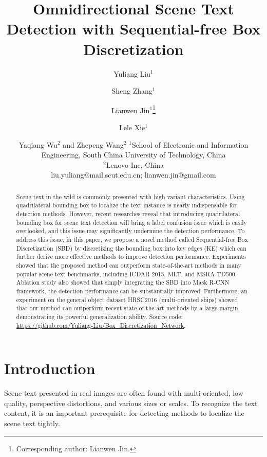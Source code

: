 \documentclass{article}
\title{Omnidirectional Scene Text Detection with Sequential-free Box Discretization}
\author{
Yuliang Liu$^1$\and
Sheng Zhang$^1$\and
Lianwen Jin$^1$\footnote{Corresponding author: Lianwen Jin.}\and
Lele Xie$^1$\and
Yaqiang Wu$^2$ \textnormal{and} Zhepeng Wang$^2$
\affiliations
$^1$School of Electronic and Information Engineering, South China University of Technology, China \\
$^2$Lenovo Inc, China\\
\emails
liu.yuliang@mail.scut.edu.cn; lianwen.jin@gmail.com
}
\begin{document}
\maketitle

\begin{abstract}
Scene text in the wild is commonly presented with high variant characteristics. Using quadrilateral bounding box to localize the text instance is nearly indispensable for detection methods. However, recent researches reveal that introducing quadrilateral bounding box for scene text detection will bring a label confusion issue which is easily overlooked, and this issue may significantly undermine the detection performance. 
To address this issue, in this paper, we propose a novel method called Sequential-free Box Discretization (SBD) by discretizing the bounding box into key edges (KE) which can further derive more effective methods to improve detection performance. 
Experiments showed that the proposed method can outperform state-of-the-art methods in many popular scene text benchmarks, including ICDAR 2015, MLT, and MSRA-TD500. Ablation study also showed that simply integrating the SBD into Mask R-CNN framework, the detection performance can be substantially improved.
Furthermore, an experiment on the general object dataset HRSC2016 (multi-oriented ships) showed that our method can outperform recent state-of-the-art methods by a large margin, demonstrating its powerful generalization ability. Source code: {\color{blue} \url{https://github.com/Yuliang-Liu/Box\_Discretization\_Network}}.

\end{abstract}

\section{Introduction}\label{sec:intro}
 Scene text presented in real images are often found with multi-oriented, low quality, perspective distortions, and various sizes or scales. To recognize the text content, it is an important prerequisite for detecting methods to localize the scene text tightly.
\end{document}
